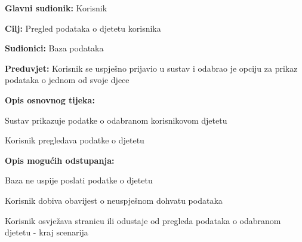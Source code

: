 					\noindent {}
					\begin{packed_item}
	
						\item \textbf{Glavni sudionik: }Korisnik
						\item  \textbf{Cilj:} Pregled podataka o djetetu korisnika
						\item  \textbf{Sudionici:} Baza podataka
						\item  \textbf{Preduvjet:} Korisnik se uspješno prijavio u sustav i odabrao je opciju za prikaz podataka o jednom od svoje djece
						\item  \textbf{Opis osnovnog tijeka:}
						
						\item[] \begin{packed_enum}
							\item Sustav prikazuje podatke o odabranom korisnikovom djetetu
							\item Korisnik pregledava podatke o djetetu
						\end{packed_enum}
						\item  \textbf{Opis mogućih odstupanja:}

						\item[] \begin{packed_item}
							\item[1.a] Baza ne uspije poslati podatke o djetetu
							\item[] \begin{packed_enum}
								
								\item Korisnik dobiva obavijest o neuspješnom dohvatu podataka
								\item Korisnik osvježava stranicu ili odustaje od pregleda podataka o odabranom djetetu - kraj scenarija
							
							\end{packed_enum}	
						\end{packed_item}	
					\end{packed_item}

